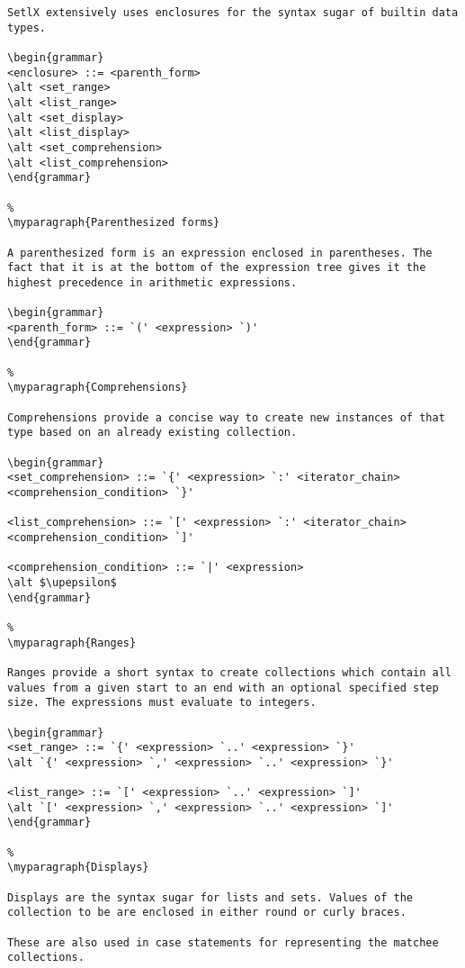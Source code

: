 \begin{verbatim}
SetlX extensively uses enclosures for the syntax sugar of builtin data types.

\begin{grammar}
<enclosure> ::= <parenth_form>
\alt <set_range>
\alt <list_range>
\alt <set_display>
\alt <list_display>
\alt <set_comprehension>
\alt <list_comprehension>
\end{grammar}

%
\myparagraph{Parenthesized forms}

A parenthesized form is an expression enclosed in parentheses. The fact that it is at the bottom of the expression tree gives it the highest precedence in arithmetic expressions.

\begin{grammar}
<parenth_form> ::= `(' <expression> `)'
\end{grammar}

%
\myparagraph{Comprehensions}

Comprehensions provide a concise way to create new instances of that type based on an already existing collection.

\begin{grammar}
<set_comprehension> ::= `{' <expression> `:' <iterator_chain> <comprehension_condition> `}'

<list_comprehension> ::= `[' <expression> `:' <iterator_chain> <comprehension_condition> `]'

<comprehension_condition> ::= `|' <expression>
\alt $\upepsilon$
\end{grammar}

%
\myparagraph{Ranges}

Ranges provide a short syntax to create collections which contain all values from a given start to an end with an optional specified step size. The expressions must evaluate to integers.

\begin{grammar}
<set_range> ::= `{' <expression> `..' <expression> `}'
\alt `{' <expression> `,' <expression> `..' <expression> `}'

<list_range> ::= `[' <expression> `..' <expression> `]'
\alt `[' <expression> `,' <expression> `..' <expression> `]'
\end{grammar}

%
\myparagraph{Displays}

Displays are the syntax sugar for lists and sets. Values of the collection to be are enclosed in either round or curly braces. 

These are also used in case statements for representing the matchee collections.


\end{verbatim}
